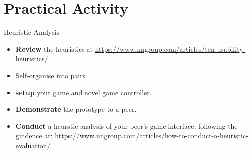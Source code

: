 \documentclass[xcolor={dvipsnames}]{beamer}\usepackage{etoolbox}\newtoggle{printable}\togglefalse{printable}
\begin{document}
\part{Practical Activity}
\frame{\partpage}

\begin{frame}{Heuristic Analysis}
	\begin{itemize}
		\item \textbf{Review} the heuristics at \url{https://www.nngroup.com/articles/ten-usability-heuristics/}.
		\item Self-organise into pairs.
		\item \textbf{setup} your game and novel game controller.
		\item \textbf{Demonstrate} the prototype to a peer.
		\item \textbf{Conduct} a heurstic analysis of your peer's game interface, following the guidence at:
		\url{https://www.nngroup.com/articles/how-to-conduct-a-heuristic-evaluation/}
	\end{itemize}
\end{frame}


%
\end{document}
